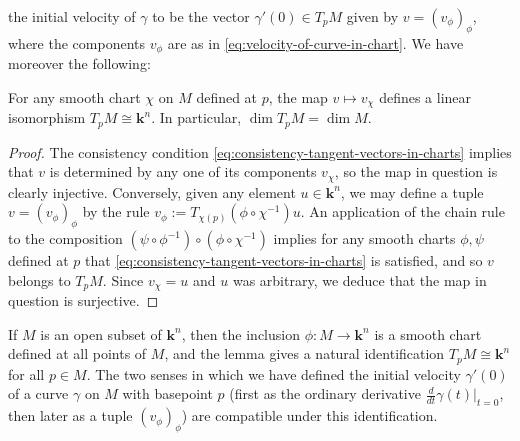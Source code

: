 \documentclass[reqno]{amsart} 
\begin{document}
the initial velocity of $\gamma$ to be the  vector
$\gamma '(0) \in T_p M$
given by $v = (v_\phi)_\phi$,
where the  components $v_\phi$ are as in \eqref{eq:velocity-of-curve-in-chart}.
We have moreover the following:
\begin{lemma}\label{lem:describe-tangent-space}
  For any smooth chart $\chi$ on $M$ defined at $p$,
  the map $v \mapsto v_\chi$
  defines a linear isomorphism
  $T_p M \cong \mathbf{k}^n$.
  In particular, $\dim T_p M = \dim M$.
\end{lemma}
\begin{proof}
  The consistency condition \eqref{eq:consistency-tangent-vectors-in-charts} implies that
  $v$ is determined by any one of its components
  $v_\chi$,
  so the map in question
  is clearly injective.
  Conversely, given any element $u \in \mathbf{k}^n$,
  we may define a tuple $v = (v_\phi)_\phi$
  by the rule
  $v_\phi := T_{\chi(p)}(\phi \circ \chi^{-1}) u$.
  An application of the chain rule to the composition
  $(\psi \circ \phi^{-1}) \circ (\phi \circ  \chi^{-1})$
  implies for any smooth charts $\phi,\psi$
  defined at $p$ that \eqref{eq:consistency-tangent-vectors-in-charts} is
  satisfied,
  and so $v$ belongs to $T_p M$.
  Since $v_\chi = u$ and $u$ was arbitrary, we deduce that the
  map in question is
  surjective.
\end{proof}



\begin{example}\label{example:tangent-space-open-subset-euclidean-space}
  If $M$ is an open subset of $\mathbf{k}^n$,
  then the inclusion $\phi : M \rightarrow \mathbf{k}^n$
  is a smooth chart defined at all points of $M$,
  and the lemma gives a natural identification $T_p M \cong
  \mathbf{k}^n$
  for all $p \in M$.
  The two senses in which we have defined the initial velocity
  $\gamma'(0)$ of a curve $\gamma$ on $M$ with basepoint $p$
  (first as the ordinary derivative $\frac{d }{d t}
  \gamma(t)|_{t=0}$, 
  then later as a tuple $(v_\phi)_\phi$)
  are compatible under this identification.
\end{example}
\end{document}
